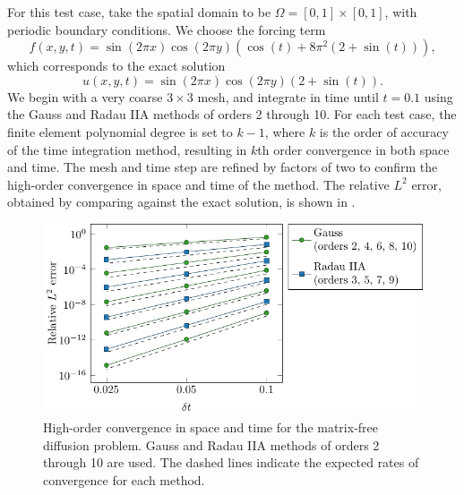 \documentclass[a4paper,10pt]{article}
\begin{document}
For this test case, take the spatial domain to be $\Omega = [0,1] \times [0,1]$, with periodic boundary conditions.
We choose the forcing term
\[
	f(x, y, t) = \sin (2\pi x)\cos(2\pi y) \left(\cos(t) + 8 \pi^2 (2 + \sin(t)) \right),
\]
which corresponds to the exact solution
\[
	u(x, y, t) = \sin(2\pi x)\cos(2\pi y)(2 + \sin(t)).
\]
We begin with a very coarse $3 \times 3$ mesh, and integrate in time until $t=0.1$ using the Gauss and Radau IIA methods of orders 2 through 10.
For each test case, the finite element polynomial degree is set to $k-1$, where $k$ is the order of accuracy of the time integration method, resulting in $k$th order convergence in both space and time.
The mesh and time step are refined by factors of two to confirm the high-order convergence in space and time of the method.
The relative $L^2$ error, obtained by comparing against the exact solution, is shown in .

\begin{figure}[!ht]
	\centering
	\includegraphics{figures/high_order_diff_error_plot/ho_diff_errors}
	\caption{
		High-order convergence in space and time for the matrix-free diffusion problem.
		Gauss and Radau IIA methods of orders 2 through 10 are used.
		The dashed lines indicate the expected rates of convergence for each method.
	}
	\label{fig:high-order-diff-errors}
\end{figure}
\end{document}
